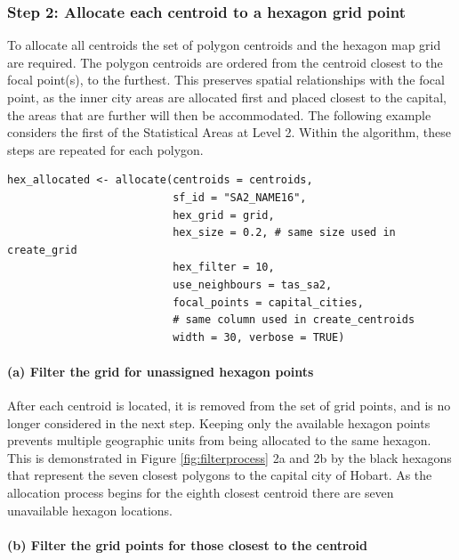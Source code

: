 \hypertarget{step-2-allocate-each-centroid-to-a-hexagon-grid-point}{%
\subsubsection{Step 2: Allocate each centroid to a hexagon grid
point}\label{step-2-allocate-each-centroid-to-a-hexagon-grid-point}}

To allocate all centroids the set of polygon centroids and the hexagon
map grid are required. The polygon centroids are ordered from the
centroid closest to the focal point(s), to the furthest. This preserves
spatial relationships with the focal point, as the inner city areas are
allocated first and placed closest to the capital, the areas that are
further will then be accommodated. The following example considers the
first of the Statistical Areas at Level 2. Within the algorithm, these
steps are repeated for each polygon.

\begin{verbatim}
hex_allocated <- allocate(centroids = centroids,
                          sf_id = "SA2_NAME16",
                          hex_grid = grid,
                          hex_size = 0.2, # same size used in create_grid
                          hex_filter = 10,
                          use_neighbours = tas_sa2,
                          focal_points = capital_cities,
                          # same column used in create_centroids
                          width = 30, verbose = TRUE)
\end{verbatim}

\hypertarget{a-filter-the-grid-for-unassigned-hexagon-points}{%
\paragraph{(a) Filter the grid for unassigned hexagon
points}\label{a-filter-the-grid-for-unassigned-hexagon-points}}

After each centroid is located, it is removed from the set of grid
points, and is no longer considered in the next step. Keeping only the
available hexagon points prevents multiple geographic units from being
allocated to the same hexagon. This is demonstrated in Figure
\ref{fig:filterprocess} 2a and 2b by the black hexagons that represent
the seven closest polygons to the capital city of Hobart. As the
allocation process begins for the eighth closest centroid there are
seven unavailable hexagon locations.

\hypertarget{b-filter-the-grid-points-for-those-closest-to-the-centroid}{%
\paragraph{(b) Filter the grid points for those closest to the
centroid}\label{b-filter-the-grid-points-for-those-closest-to-the-centroid}}

